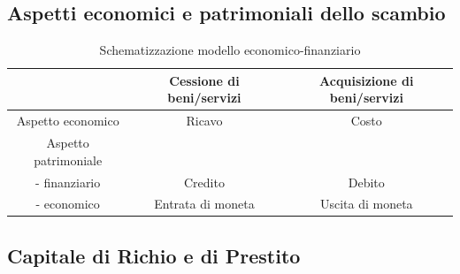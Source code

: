 \subsection{Aspetti economici e patrimoniali dello scambio}
\begin{table}[h!]
	\begin{tabular}{|c | c | c|}
		\hline
		& Cessione di beni/servizi & Acquisizione di beni/servizi \\
		\hline
		Aspetto economico & Ricavo & Costo \\
		\hline
		Aspetto patrimoniale & & \\
		- finanziario & Credito & Debito \\
		- economico & Entrata di moneta & Uscita di moneta \\
		\hline
	\end{tabular}
	\centering
	\caption{Schematizzazione modello economico-finanziario}
\end{table}

\subsection{Capitale di Richio e di Prestito}
